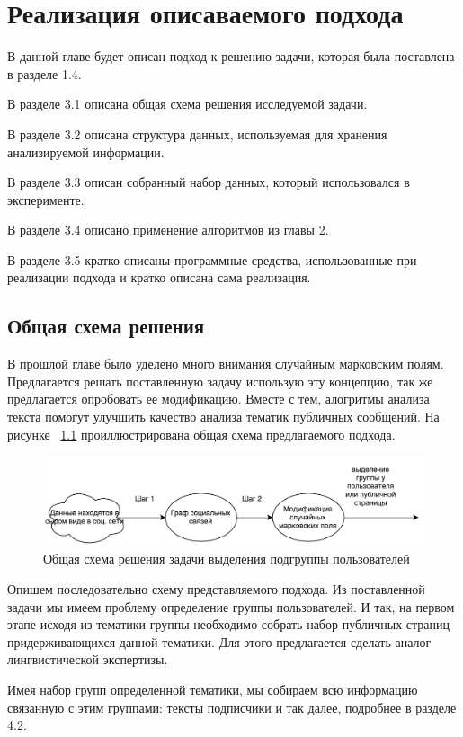 \documentclass[annotation,times,page4]{itmo-student-thesis}
\begin{document}
\chapter{Реализация описаваемого подхода}
В данной главе будет описан подход к решению задачи, которая была поставлена в разделе 1.4.

В разделе 3.1 описана общая схема решения исследуемой задачи. 

В разделе 3.2 описана структура данных, используемая для хранения анализируемой информации. 

В разделе 3.3 описан собранный набор данных, который использовался в эксперименте.

В разделе 3.4 описано применение алгоритмов из главы 2.

В разделе 3.5 кратко описаны программные средства, использованные при реализации подхода и кратко описана сама реализация.

\section{Общая схема решения}
В прошлой главе было уделено много внимания случайным марковским полям. Предлагается решать поставленную задачу использую эту концепцию, так же предлагается опробовать ее модификацию. Вместе с тем, алогритмы анализа текста помогут улучшить качество анализа тематик публичных сообщений. На рисунке ~\ref{fig:plan} проиллюстрирована общая схема предлагаемого подхода.

\begin{figure}[!h]
\caption{Общая схема решения задачи выделения подгруппы пользователей}
\label{fig:plan}
\centering
\includegraphics[width=\textwidth]{figs/plan.pdf}
\end{figure}

Опишем последовательно схему представляемого подхода. Из поставленной задачи мы имеем проблему определение группы пользователей. И так, на первом этапе исходя из тематики группы необходимо собрать набор публичных страниц придерживающихся данной тематики. Для этого предлагается сделать аналог лингвистической экспертизы. 

Имея набор групп определенной тематики, мы собираем всю информацию связанную с этим группами: тексты подписчики и так далее, подробнее в разделе 4.2.
\end{document}
